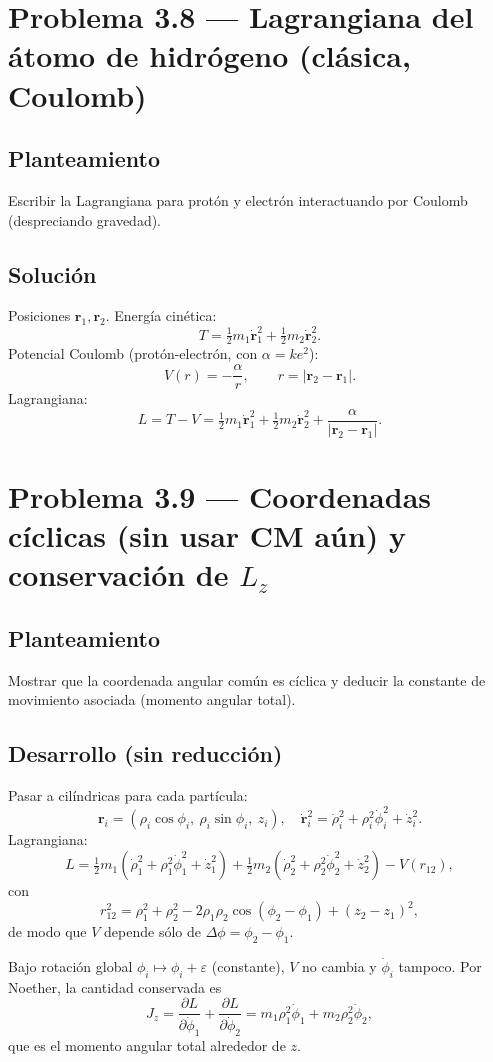 \documentclass[12pt]{article}
\begin{document}
\section*{Problema 3.8 — Lagrangiana del átomo de hidrógeno (clásica, Coulomb)}
\subsection*{Planteamiento}
Escribir la Lagrangiana para protón y electrón interactuando por Coulomb (despreciando gravedad).

\subsection*{Solución}
Posiciones \(\mathbf r_1,\mathbf r_2\). Energía cinética:
\[
T = \tfrac12 m_1\dot{\mathbf r}_1^2 + \tfrac12 m_2\dot{\mathbf r}_2^2.
\]
Potencial Coulomb (protón-electrón, con \(\alpha=k e^2\)):
\[
V(r) = -\frac{\alpha}{r},\qquad r=|\mathbf r_2-\mathbf r_1|.
\]
Lagrangiana:
\[
\boxed{L = T - V = \tfrac12 m_1\dot{\mathbf r}_1^2 + \tfrac12 m_2\dot{\mathbf r}_2^2 + \frac{\alpha}{|\mathbf r_2-\mathbf r_1|}.}
\]

\section*{Problema 3.9 — Coordenadas cíclicas (sin usar CM aún) y conservación de \(L_z\)}
\subsection*{Planteamiento}
Mostrar que la coordenada angular común es cíclica y deducir la constante de movimiento asociada (momento angular total).

\subsection*{Desarrollo (sin reducción)}
Pasar a cilíndricas para cada partícula:
\[
\mathbf r_i = (\rho_i\cos\phi_i,\ \rho_i\sin\phi_i,\ z_i),\quad
\dot{\mathbf r}_i^2=\dot\rho_i^2+\rho_i^2\dot\phi_i^2+\dot z_i^2.
\]
Lagrangiana:
\[
L=\tfrac12 m_1(\dot\rho_1^2+\rho_1^2\dot\phi_1^2+\dot z_1^2)
+\tfrac12 m_2(\dot\rho_2^2+\rho_2^2\dot\phi_2^2+\dot z_2^2)
- V(r_{12}),
\]
con
\[
r_{12}^2 = \rho_1^2+\rho_2^2-2\rho_1\rho_2\cos(\phi_2-\phi_1)+(z_2-z_1)^2,
\]
de modo que \(V\) depende sólo de \(\Delta\phi=\phi_2-\phi_1\).

Bajo rotación global \(\phi_i\mapsto\phi_i+\varepsilon\) (constante), \(V\) no cambia y \(\dot\phi_i\) tampoco. Por Noether, la cantidad conservada es
\[
J_z = \frac{\partial L}{\partial\dot\phi_1} + \frac{\partial L}{\partial\dot\phi_2}
= m_1\rho_1^2\dot\phi_1 + m_2\rho_2^2\dot\phi_2,
\]
que es el momento angular total alrededor de \(z\).
\end{document}
